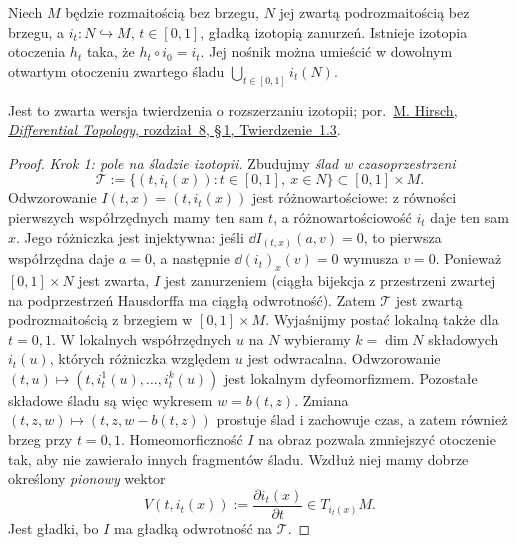 \begin{twierdzenie}
\label{thm:rozszerzenie-izotopii}
Niech $M$ będzie rozmaitością bez brzegu,
$N$ jej zwartą podrozmaitością bez brzegu,
a $i_t\colon N\hookrightarrow M$, $t\in[0,1]$, gładką
izotopią zanurzeń. Istnieje izotopia otoczenia $h_t$ taka, że
$h_t\circ i_0=i_t$. Jej nośnik można umieścić w dowolnym
otwartym otoczeniu zwartego śladu
$\bigcup_{t\in[0,1]}i_t(N)$.
\end{twierdzenie}
Jest to zwarta wersja twierdzenia o rozszerzaniu izotopii;
por.\ \href{https://webhomes.maths.ed.ac.uk/~v1ranick/papers/hirschdx.pdf}
{M. Hirsch, \emph{Differential Topology}, rozdział~8, \S\,1,
Twierdzenie~1.3}.
\begin{proof}
\emph{Krok 1: pole na śladzie izotopii.}
Zbudujmy \emph{ślad w czasoprzestrzeni}
\[
 \mathcal T:=\{(t,i_t(x)):t\in[0,1],\ x\in N\}
 \subset[0,1]\times M.
\]
Odwzorowanie $I(t,x)=(t,i_t(x))$ jest różnowartościowe:
z równości pierwszych współrzędnych mamy ten sam $t$,
a różnowartościowość $i_t$ daje ten sam $x$.
Jego różniczka jest injektywna: jeśli
$\dd I_{(t,x)}(a,v)=0$, to pierwsza współrzędna daje
$a=0$, a następnie $\dd (i_t)_x(v)=0$ wymusza $v=0$.
Ponieważ $[0,1]\times N$ jest zwarta, $I$ jest zanurzeniem
(ciągła bijekcja z przestrzeni zwartej na podprzestrzeń
Hausdorffa ma ciągłą odwrotność). Zatem $\mathcal T$
jest zwartą podrozmaitością z brzegiem w $[0,1]\times M$.
Wyjaśnijmy postać lokalną także dla $t=0,1$. W lokalnych
współrzędnych $u$ na $N$ wybieramy $k=\dim N$ składowych $i_t(u)$,
których różniczka względem $u$ jest odwracalna. Odwzorowanie
$(t,u)\mapsto(t,i_t^1(u),\ldots,i_t^k(u))$ jest lokalnym
dyfeomorfizmem. Pozostałe składowe śladu są więc wykresem
$w=b(t,z)$. Zmiana $(t,z,w)\mapsto(t,z,w-b(t,z))$ prostuje
ślad i zachowuje czas, a zatem również brzeg przy $t=0,1$.
Homeomorficzność $I$ na obraz pozwala zmniejszyć otoczenie tak,
aby nie zawierało innych fragmentów śladu.
Wzdłuż niej mamy dobrze określony \emph{pionowy} wektor
\[
 V(t,i_t(x)):=\frac{\partial i_t(x)}{\partial t}
 \in T_{i_t(x)}M.
\]
Jest gładki, bo $I$ ma gładką odwrotność na $\mathcal T$.


\end{proof}
